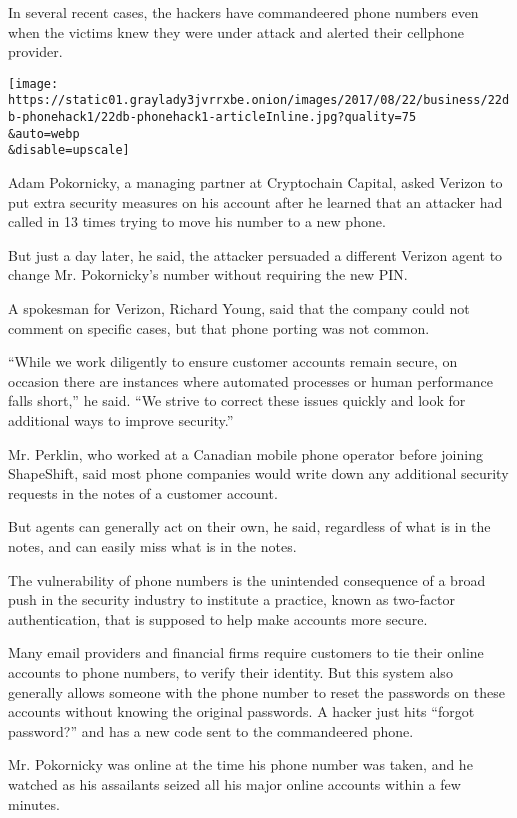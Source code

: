 In several recent cases, the hackers have commandeered phone numbers
even when the victims knew they were under attack and alerted their
cellphone provider.

\texttt{[image: https://static01.graylady3jvrrxbe.onion/images/2017/08/22/business/22db-phonehack1/22db-phonehack1-articleInline.jpg?quality=75\\\&auto=webp\\\&disable=upscale]}

Adam Pokornicky, a managing partner at Cryptochain Capital, asked
Verizon to put extra security measures on his account after he learned
that an attacker had called in 13 times trying to move his number to a
new phone.

But just a day later, he said, the attacker persuaded a different
Verizon agent to change Mr. Pokornicky's number without requiring the
new PIN.

A spokesman for Verizon, Richard Young, said that the company could not
comment on specific cases, but that phone porting was not common.

``While we work diligently to ensure customer accounts remain secure, on
occasion there are instances where automated processes or human
performance falls short,'' he said. ``We strive to correct these issues
quickly and look for additional ways to improve security.''

Mr. Perklin, who worked at a Canadian mobile phone operator before
joining ShapeShift, said most phone companies would write down any
additional security requests in the notes of a customer account.

But agents can generally act on their own, he said, regardless of what
is in the notes, and can easily miss what is in the notes.

The vulnerability of phone numbers is the unintended consequence of a
broad push in the security industry to institute a practice, known as
two-factor authentication, that is supposed to help make accounts more
secure.

Many email providers and financial firms require customers to tie their
online accounts to phone numbers, to verify their identity. But this
system also generally allows someone with the phone number to reset the
passwords on these accounts without knowing the original passwords. A
hacker just hits ``forgot password?'' and has a new code sent to the
commandeered phone.

Mr. Pokornicky was online at the time his phone number was taken, and he
watched as his assailants seized all his major online accounts within a
few minutes.

